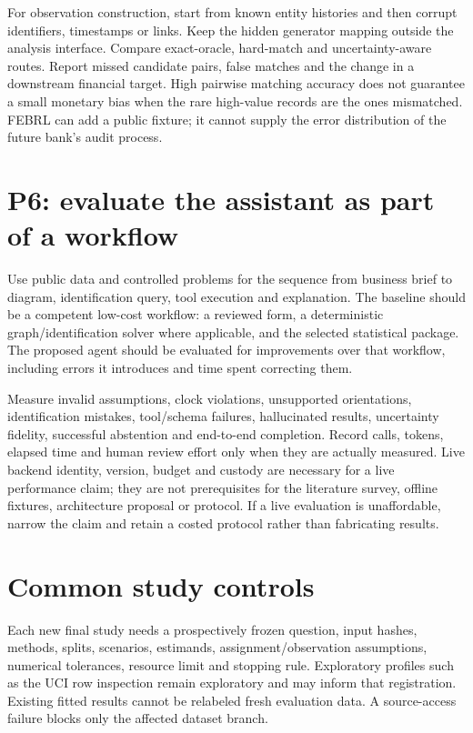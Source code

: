 For observation construction, start from known entity histories and then
corrupt identifiers, timestamps or links. Keep the hidden generator
mapping outside the analysis interface. Compare exact-oracle, hard-match
and uncertainty-aware routes. Report missed candidate pairs, false
matches and the change in a downstream financial target. High pairwise
matching accuracy does not guarantee a small monetary bias when the rare
high-value records are the ones mismatched. FEBRL can add a public
fixture; it cannot supply the error distribution of the future bank's
audit process.

\hypertarget{p6-evaluate-the-assistant-as-part-of-a-workflow}{%
\section{P6: evaluate the assistant as part of a
workflow}\label{p6-evaluate-the-assistant-as-part-of-a-workflow}}

Use public data and controlled problems for the sequence from business
brief to diagram, identification query, tool execution and explanation.
The baseline should be a competent low-cost workflow: a reviewed form, a
deterministic graph/identification solver where applicable, and the
selected statistical package. The proposed agent should be evaluated for
improvements over that workflow, including errors it introduces and time
spent correcting them.

Measure invalid assumptions, clock violations, unsupported orientations,
identification mistakes, tool/schema failures, hallucinated results,
uncertainty fidelity, successful abstention and end-to-end completion.
Record calls, tokens, elapsed time and human review effort only when
they are actually measured. Live backend identity, version, budget and
custody are necessary for a live performance claim; they are not
prerequisites for the literature survey, offline fixtures, architecture
proposal or protocol. If a live evaluation is unaffordable, narrow the
claim and retain a costed protocol rather than fabricating results.

\hypertarget{common-study-controls}{%
\section{Common study controls}\label{common-study-controls}}

Each new final study needs a prospectively frozen question, input
hashes, methods, splits, scenarios, estimands, assignment/observation
assumptions, numerical tolerances, resource limit and stopping rule.
Exploratory profiles such as the UCI row inspection remain exploratory
and may inform that registration. Existing fitted results cannot be
relabeled fresh evaluation data. A source-access failure blocks only the
affected dataset branch.

